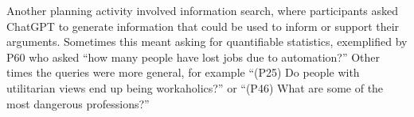 \documentclass[manuscript,screen,acmsmall]{acmart}
\begin{document}
        Another planning activity involved information search, where participants asked ChatGPT to generate information that could be used to inform or support their arguments.
        Sometimes this meant asking for quantifiable statistics, exemplified by P60 who asked ``how many people have lost jobs due to automation?''
        Other times the queries were more general, for example ``(P25) Do people with utilitarian views end up being workaholics?'' or ``(P46) What are some of the most dangerous professions?''
\end{document}
